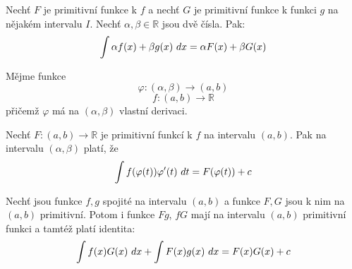 \begin{theorem}
	Nechť $F$ je primitivní funkce k $f$
	a nechť $G$ je primitivní funkce k funkci $g$
	na nějakém intervalu $I$.
	Nechť $\alpha, \beta \in \mathbb{R}$ jsou dvě čísla.
	Pak:
	$$\int \alpha f(x) + \beta g(x) \ dx = \alpha F(x) + \beta G(x)$$
	\label{thm:integral_linearni_kombinace}
\end{theorem}

\begin{theorem}[O substituci]
	Mějme funkce
	$$\varphi \colon (\alpha, \beta) \rightarrow (a, b)$$
	$$f \colon (a, b) \rightarrow \mathbb{R}$$
	přičemž $\varphi$ má na $(\alpha, \beta)$ vlastní derivaci.

	Nechť $F \colon (a, b) \rightarrow \mathbb{R}$ je primitivní funkcí k $f$ na intervalu $(a, b)$.
	Pak na intervalu $(\alpha, \beta)$ platí, že
	$$\int f(\varphi(t)) \varphi'(t) \ dt = F(\varphi(t)) + c$$
	\label{thm:integral_veta_o_substituci}
\end{theorem}

\begin{theorem}
	Nechť jsou funkce $f, g$ spojité na intervalu $(a, b)$ a funkce $F, G$ jsou k nim na $(a, b)$ primitivní.
	Potom i funkce $Fg$, $fG$ mají na intervalu $(a, b)$ primitivní funkci a tamtéž platí identita:
	$$\int f(x) G(x) \ dx + \int F(x) g(x) \ dx = F(x) G(x) + c$$
	\label{thm:integrace_per_partes}
\end{theorem}

